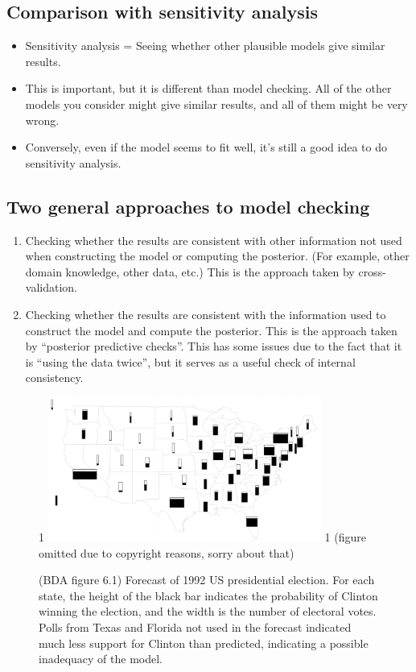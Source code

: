 \documentclass[12pt]{article}
\newcommand{\blind}{1}
\begin{document}
\subsection*{Comparison with sensitivity analysis}
\begin{itemize}
\item Sensitivity analysis = Seeing whether other plausible models give similar results.
\item This is important, but it is different than model checking. All of the other models you consider might give similar results, and all of them might be very wrong.
\item Conversely, even if the model seems to fit well, it's still a good idea to do sensitivity analysis.
\end{itemize}

\subsection*{Two general approaches to model checking}
\begin{enumerate}
\item Checking whether the results are consistent with other information not used when constructing the model or computing the posterior. (For example, other domain knowledge, other data, etc.) This is the approach taken by cross-validation.
\item Checking whether the results are consistent with the information used to construct the model and compute the posterior. This is the approach taken by ``posterior predictive checks''. This has some issues due to the fact that it is ``using the data twice'', but it serves as a useful check of internal consistency.
\end{enumerate}


\begin{figure}
\begin{center}
\blind { \includegraphics[width=0.8\textwidth]{election.png} } \fi
{}\blind { (figure omitted due to copyright reasons, sorry about that) } \fi
\end{center}
\caption{(BDA figure 6.1) Forecast of 1992 US presidential election. For each state, the height of the black bar indicates the probability of Clinton winning the election, and the width is the number of electoral votes. Polls from Texas and Florida not used in the forecast indicated much less support for Clinton than predicted, indicating a possible inadequacy of the model.}
\end{figure}
\end{document}
